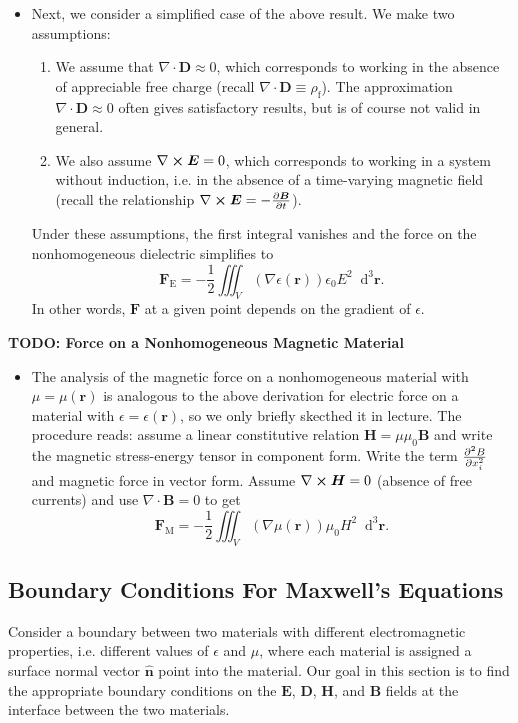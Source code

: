\documentclass[11pt, a4paper]{article}
\newcommand{\diff}{\mathop{}\!\mathrm{d}} %
\newcommand{\dr}{\diff^{3} \r}  %
\renewcommand{\vec}[1]{\bm{#1}} %
\newcommand{\uvec}[1]{\hat{\vec{#1}}} %
\renewcommand{\r}{\vec{r}}
\newcommand{\E}{\vec{E}} %
\newcommand{\D}{\vec{D}}  %
\newcommand{\B}{\vec{B}} %
\renewcommand{\H}{\vec{H}}  %
\newcommand{\e}{\epsilon}
\newcommand{\ee}{\epsilon_{0}}  %
\newcommand{\mm}{\mu_{0}}  %
\renewcommand{\div}{\nabla \cdot}
\renewcommand{\curl}{\nabla \cross}
\renewcommand{\grad}{\nabla}
\begin{document}
\begin{itemize}
	\item Next, we consider a simplified case of the above result. We make two assumptions:
    \begin{enumerate}
        \item We assume that $ \div \D \approx 0 $, which corresponds to working in the absence of appreciable free charge (recall $ \div \D \equiv \rho_{\text{f}} $). The approximation $ \div \D \approx 0 $ often gives satisfactory results, but is of course not valid in general.
        
        \item We also assume $ \curl \E = 0 $, which corresponds to working in a system without induction, i.e. in the absence of a time-varying magnetic field (recall the relationship $ \curl \E = - \pdv{\B}{t} $).
    \end{enumerate}
    Under these assumptions, the first integral vanishes and the force on the nonhomogeneous dielectric simplifies to
	\begin{equation*}
		\vec{F}_{\text{E}} = - \frac{1}{2}\iiint_{V}(\grad \e(\r))\ee E^{2}\dr.
	\end{equation*}
	In other words, $ \vec{F} $ at a given point depends on the gradient of $ \e $. 
	
	
\end{itemize}

\textbf{TODO: Force on a Nonhomogeneous Magnetic Material}
\begin{itemize}
    \item The analysis of the magnetic force on a nonhomogeneous material with $ \mu = \mu(\r) $ is analogous to the above derivation for electric force on a material with $ \e = \e(\r) $, so we only briefly skecthed it in lecture. The procedure reads: assume a linear constitutive relation $ \H = \mu \mm \B $ and write the magnetic stress-energy tensor in component form. Write the term $ \pdv[2]{B}{x_{i}} $ and magnetic force in vector form. Assume $ \curl \H = 0 $ (absence of free currents) and use $ \div \B = 0 $ to get
	\begin{equation*}
		\vec{F}_{\text{M}} = -\frac{1}{2}\iiint_{V} (\grad \mu(\r))\mm H^{2}\dr.
	\end{equation*}
\end{itemize}


\subsection{Boundary Conditions For Maxwell's Equations}
Consider a boundary between two materials with different electromagnetic properties, i.e. different values of $ \epsilon $ and $ \mu $, where each material is assigned a surface normal vector $ \uvec{n} $ point into the material. Our goal in this section is to find the appropriate boundary conditions on the $ \E $, $ \D $, $ \H $, and $ \B $ fields at the interface between the two materials.
\end{document}
